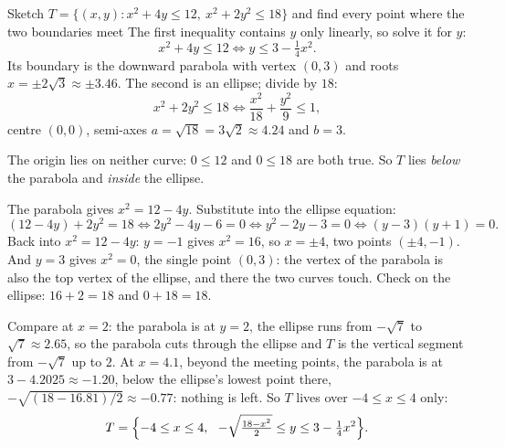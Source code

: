 \begin{worked}{Sketch $T=\{(x,y):x^{2}+4y\le12,\ x^{2}+2y^{2}\le18\}$ and find every point where the two boundaries meet}
The first inequality contains $y$ only linearly, so solve it for $y$:
\[
  x^{2}+4y\le12\iff y\le3-\tfrac14x^{2}.
\]
Its boundary is the downward parabola with vertex $(0,3)$ and roots
$x=\pm2\sqrt3\approx\pm3.46$. The second is an ellipse; divide by $18$:
\[
  x^{2}+2y^{2}\le18\iff\frac{x^{2}}{18}+\frac{y^{2}}{9}\le1,
\]
centre $(0,0)$, semi-axes $a=\sqrt{18}=3\sqrt2\approx4.24$ and $b=3$.

The origin lies on neither curve: $0\le12$ and $0\le18$ are both true. So
$T$ lies \emph{below} the parabola and \emph{inside} the ellipse.

The parabola gives $x^{2}=12-4y$. Substitute into the ellipse equation:
\[
  (12-4y)+2y^{2}=18\iff 2y^{2}-4y-6=0\iff y^{2}-2y-3=0
  \iff (y-3)(y+1)=0 .
\]
Back into $x^{2}=12-4y$: $y=-1$ gives $x^{2}=16$, so $x=\pm4$, two points
$(\pm4,-1)$. And $y=3$ gives $x^{2}=0$, the single point $(0,3)$: the
vertex of the parabola is also the top vertex of the ellipse, and there the
two curves touch. Check on the ellipse: $16+2=18$ and $0+18=18$.
\checkmark
{}

Compare at $x=2$: the parabola is at $y=2$, the ellipse runs from
$-\sqrt7$ to $\sqrt7\approx2.65$, so the parabola cuts through the ellipse
and $T$ is the vertical segment from $-\sqrt7$ up to $2$. At $x=4.1$,
beyond the meeting points, the parabola is at $3-4.2025\approx-1.20$,
below the ellipse's lowest point there, $-\sqrt{(18-16.81)/2}\approx-0.77$:
nothing is left. So $T$ lives over $-4\le x\le4$ only:
\[
  T=\Bigl\{-4\le x\le4,\ \ -\sqrt{\tfrac{18-x^{2}}{2}}\le y\le
  3-\tfrac14x^{2}\Bigr\} .
\]


\end{worked}
